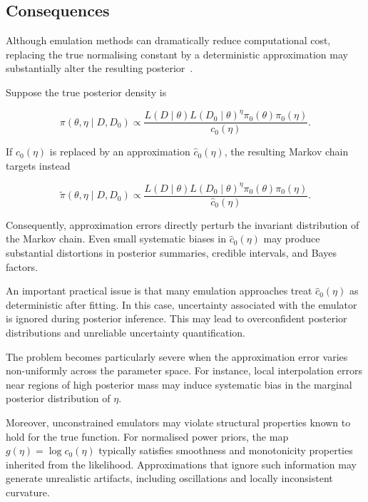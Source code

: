 \subsection{Consequences}

Although emulation methods can dramatically reduce computational cost, replacing the true normalising constant by a deterministic approximation may substantially alter the resulting posterior~\cite{park2017, park2020}.

Suppose the true posterior density is

\begin{equation}
    \pi(\theta, \eta \mid D, D_0)
    \propto
    \frac{
        L(D \mid \theta)
        L(D_0 \mid \theta)^\eta
        \pi_0(\theta)
        \pi_0(\eta)
    }{
        c_0(\eta)
    }.
\end{equation}

If $c_0(\eta)$ is replaced by an approximation $\widehat c_0(\eta)$, the resulting Markov chain targets instead

\begin{equation}
    \widetilde \pi(\theta, \eta \mid D, D_0)
    \propto
    \frac{
        L(D \mid \theta)
        L(D_0 \mid \theta)^\eta
        \pi_0(\theta)
        \pi_0(\eta)
    }{
        \widehat c_0(\eta)
    }.
\end{equation}

Consequently, approximation errors directly perturb the invariant distribution of the Markov chain.
Even small systematic biases in $\widehat c_0(\eta)$ may produce substantial distortions in posterior summaries, credible intervals, and Bayes factors.

An important practical issue is that many emulation approaches treat $\widehat c_0(\eta)$ as deterministic after fitting.
In this case, uncertainty associated with the emulator is ignored during posterior inference.
This may lead to overconfident posterior distributions and unreliable uncertainty quantification.

The problem becomes particularly severe when the approximation error varies non-uniformly across the parameter space.
For instance, local interpolation errors near regions of high posterior mass may induce systematic bias in the marginal posterior distribution of $\eta$.

Moreover, unconstrained emulators may violate structural properties known to hold for the true function.
For normalised power priors, the map $g(\eta) = \log c_0(\eta)$ typically satisfies smoothness and monotonicity properties inherited from the likelihood.
Approximations that ignore such information may generate unrealistic artifacts, including oscillations and locally inconsistent curvature.

